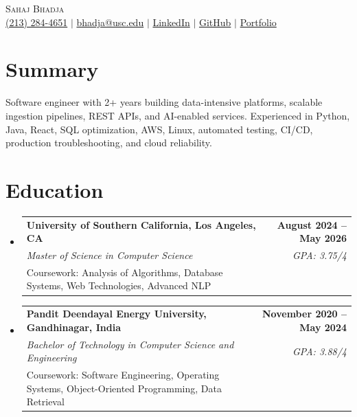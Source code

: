 \documentclass[letterpaper,10pt]{article}
\makeatletter
\newcommand{\resumeEduSubheading}[5]{\vspace{-1pt}\item\begin{tabular*}{1.0\textwidth}[t]{l@{\extracolsep{\fill}}r}\textbf{#1} & \textbf{\small #2} \\\textit{\small #3} & \textit{\small #4} \\\small #5 & \\\end{tabular*}\vspace{-4pt}}
\newcommand{\resumeSubHeadingListStart}{\begin{itemize}[leftmargin=0.0in,label={}]}
\newcommand{\resumeSubHeadingListEnd}{\end{itemize}}
\makeatother
\begin{document}
\begin{center}
  {\Huge \scshape Sahaj Bhadja} \\ \vspace{1pt}
  \small \href{tel:2132844651}{(213) 284-4651} $|$ \href{mailto:bhadja@usc.edu}{bhadja@usc.edu} $|$
  \href{https://www.linkedin.com/in/sahaj-bhadja/}{LinkedIn} $|$ \href{https://github.com/sahaj-bhadja}{GitHub} $|$ \href{https://sahaj-bhadja.github.io/}{Portfolio}
\end{center}
\vspace{-13pt}

\section{Summary}
\small Software engineer with 2+ years building data-intensive platforms, scalable ingestion pipelines, REST APIs, and AI-enabled services. Experienced in Python, Java, React, SQL optimization, AWS, Linux, automated testing, CI/CD, production troubleshooting, and cloud reliability.

\section{Education}
\resumeSubHeadingListStart
  \resumeEduSubheading{University of Southern California, Los Angeles, CA}{August 2024 -- May 2026}{Master of Science in Computer Science}{GPA: 3.75/4}{Coursework: Analysis of Algorithms, Database Systems, Web Technologies, Advanced NLP}
  \vspace{2pt}
  \resumeEduSubheading{Pandit Deendayal Energy University, Gandhinagar, India}{November 2020 -- May 2024}{Bachelor of Technology in Computer Science and Engineering}{GPA: 3.88/4}{Coursework: Software Engineering, Operating Systems, Object-Oriented Programming, Data Retrieval}
\resumeSubHeadingListEnd
\end{document}
